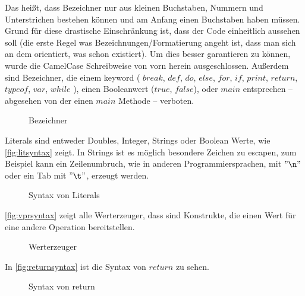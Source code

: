       Das heißt, dass Bezeichner nur aus kleinen Buchstaben, Nummern und Unterstrichen bestehen können und am Anfang einen Buchstaben haben müssen. Grund für diese drastische Einschränkung ist, dass der Code einheitlich aussehen soll (die erste Regel was Bezeichnungen/Formatierung angeht ist, dass man sich an dem orientiert, was schon existiert). Um dies besser garantieren zu können, wurde die CamelCase Schreibweise von vorn herein ausgeschlossen. Außerdem sind Bezeichner, die einem keyword
      (%
        \myMIn$break$,
        \myMIn$def$,
        \myMIn$do$,
        \myMIn$else$,
        \myMIn$for$,
        \myMIn$if$,
        \myMIn$print$,
        \myMIn$return$,
        \myMIn$typeof$,
        \myMIn$var$,
        \myMIn$while$%
      ), einen Booleanwert (\myMIn$true$, \myMIn$false$), oder \myMIn$main$ entsprechen -- abgesehen von der einen \myMIn$main$ Methode -- verboten.

      \begin{figure}[H]
        \centering
        \caption{Bezeichner}
        \label{fig:idsyntax}
      \end{figure}

      Literals sind entweder Doubles, Integer, Strings oder Boolean Werte, wie \autoref{fig:litsyntax} zeigt. In Strings ist es möglich besondere Zeichen zu escapen, zum Beispiel kann ein Zeilenumbruch, wie in anderen Programmiersprachen, mit \myMIn$"\n"$ oder ein Tab mit \myMIn$"\t"$, erzeugt werden.
      \begin{figure}[H]
        \centering
        \caption{Syntax von Literals}
        \label{fig:litsyntax}
      \end{figure}

      \autoref{fig:vprsyntax} zeigt alle Werterzeuger, dass sind Konstrukte, die einen Wert für eine andere Operation bereitstellen.
      \begin{figure}[H]
        \centering
        \caption{Werterzeuger}
        \label{fig:vprsyntax}
      \end{figure}

      In \autoref{fig:returnsyntax} ist die Syntax von \myMIn$return$ zu sehen.
      \begin{figure}[H]
        \centering
        \caption{Syntax von return}
        \label{fig:returnsyntax}
      \end{figure}

